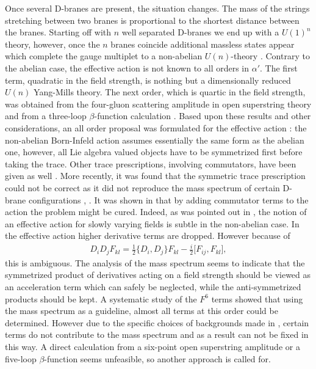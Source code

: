 \documentclass[12pt,a4paper]{article}
\begin{document}
Once several D-branes are present, the situation changes. The mass of the
strings stretching between two branes is proportional to the shortest
distance between the  branes. Starting off with $n$ well separated
D-branes we end up with a $U(1)^n$ theory, however, once the $n$ branes
coincide additional massless states appear which complete the gauge
multiplet to a non-abelian $U(n)$-theory \cite{EW1}. Contrary to the abelian case,
the effective action is not known to all orders in $\alpha '$. The first
term, quadratic in the field strength, is nothing but a dimensionally
reduced $U(n)$ Yang-Mills theory. The next order, which is quartic in the
field strength, was obtained from the four-gluon scattering amplitude
in open superstring theory \cite{GW} and
from a three-loop $\beta$-function calculation \cite{BP}. Based upon these
results and  other considerations, an all order proposal was
formulated for the effective action \cite{AT2}: the non-abelian
Born-Infeld action assumes essentially the same form as the abelian one,
however, all Lie algebra valued objects have to be symmetrized first before
taking the trace.  Other trace prescriptions, involving
commutators, have been given as well
\cite{AN}.
More recently, it was found that the symmetric trace prescription could
not be correct as it did not reproduce the mass spectrum of certain
D-brane configurations \cite{HT}, \cite{DST}.
It was shown in \cite{B}
that by adding commutator terms to the action the problem
might be cured. Indeed, as was pointed out in \cite{AT}, the notion of an
effective action for slowly varying fields is subtle in the non-abelian
case. In the effective action  higher derivative terms are dropped.
However because of
\begin{eqnarray}
D_i D_j F_{kl}=\frac 1 2 \{D_i , D_j\}F_{kl}-\frac i 2 {[}F_{ij}, F_{kl}
{]},
\end{eqnarray}
this is ambiguous. The analysis of the mass spectrum seems to indicate
that the symmetrized product of
derivatives acting on a field strength should be viewed as an acceleration
term which can safely be neglected, while the anti-symmetrized products
should be kept.
A systematic study of the $F^6$ terms \cite{STT} showed that using the
mass spectrum as a guideline, almost all terms at this order could be
determined. However due to the specific choices of backgrounds made in
\cite{STT}, certain terms do not contribute to the mass spectrum and as
a result can not be fixed in this way. A direct calculation from a
six-point open superstring amplitude or a five-loop $\beta$-function seems
unfeasible, so another approach is called for.
\end{document}
